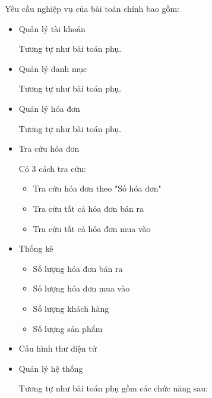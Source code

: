 Yêu cầu nghiệp vụ của bài toán chính bao gồm:

\begin{itemize}

    \item Quản lý tài khoản

          Tương tự như bài toán phụ.


    \item Quản lý danh mục

          Tương tự như bài toán phụ.

    \item Quản lý hóa đơn

          Tương tự như bài toán phụ.


    \item Tra cứu hóa đơn

          Có 3 cách tra cứu:

          \begin{itemize}



              \item Tra cứu  hóa đơn theo "Số hóa đơn"

              \item Tra cứu tất cả hóa đơn bán ra

              \item Tra cứu tất cả hóa đơn mua vào
          \end{itemize}
    \item  Thống kê

          \begin{itemize}
              \item Số lượng hóa đơn bán ra
              \item Số lượng hóa đơn mua vào
              \item Số lượng khách hàng
              \item Số lượng sản phẩm
          \end{itemize}




    \item  Cấu hình thư điện tử








    \item Quản lý hệ thống

          Tương tự như bài toán phụ gồm các chức năng sau:
\end{itemize}


